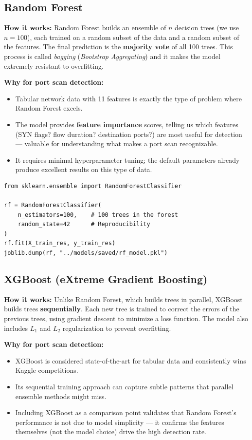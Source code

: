 \documentclass[12pt,a4paper]{report}
\begin{document}
\subsection{Random Forest}

\textbf{How it works:} Random Forest builds an ensemble of $n$ decision trees (we use $n=100$), each trained on a random subset of the data and a random subset of the features. The final prediction is the \textbf{majority vote} of all 100 trees. This process is called \textit{bagging} (\textit{Bootstrap Aggregating}) and it makes the model extremely resistant to overfitting.

\textbf{Why for port scan detection:}
\begin{itemize}
    \item Tabular network data with 11 features is exactly the type of problem where Random Forest excels.
    \item The model provides \textbf{feature importance} scores, telling us which features (SYN flags? flow duration? destination ports?) are most useful for detection --- valuable for understanding what makes a port scan recognizable.
    \item It requires minimal hyperparameter tuning; the default parameters already produce excellent results on this type of data.
\end{itemize}

\begin{lstlisting}[caption={Random Forest training}]
from sklearn.ensemble import RandomForestClassifier

rf = RandomForestClassifier(
    n_estimators=100,    # 100 trees in the forest
    random_state=42      # Reproducibility
)
rf.fit(X_train_res, y_train_res)
joblib.dump(rf, "../models/saved/rf_model.pkl")
\end{lstlisting}

\subsection{XGBoost (eXtreme Gradient Boosting)}

\textbf{How it works:} Unlike Random Forest, which builds trees in parallel, XGBoost builds trees \textbf{sequentially}. Each new tree is trained to correct the errors of the previous trees, using gradient descent to minimize a loss function. The model also includes $L_1$ and $L_2$ regularization to prevent overfitting.

\textbf{Why for port scan detection:}
\begin{itemize}
    \item XGBoost is considered state-of-the-art for tabular data and consistently wins Kaggle competitions.
    \item Its sequential training approach can capture subtle patterns that parallel ensemble methods might miss.
    \item Including XGBoost as a comparison point validates that Random Forest's performance is not due to model simplicity --- it confirms the features themselves (not the model choice) drive the high detection rate.
\end{itemize}
\end{document}
